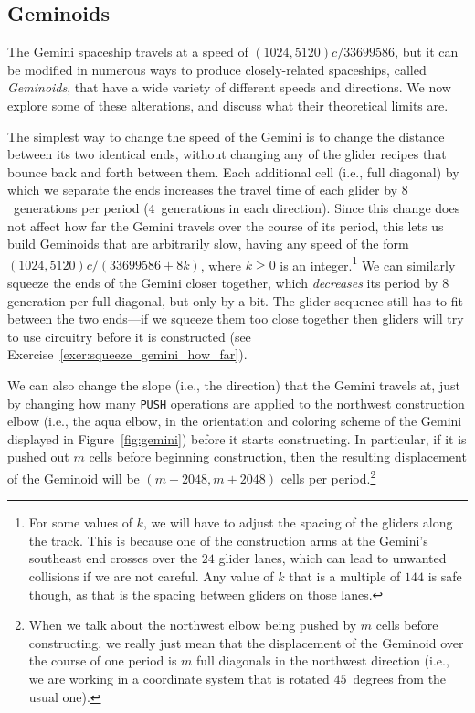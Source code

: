 \subsection{Geminoids}\label{sec:geminoids}

The Gemini spaceship travels at a speed of $(1024,5120)c/33699586$, but it can be modified in numerous ways to produce closely-related spaceships, called \emph{Geminoids}, that have a wide variety of different speeds and directions. We now explore some of these alterations, and discuss what their theoretical limits are.

The simplest way to change the speed of the Gemini is to change the distance between its two identical ends, without changing any of the glider recipes that bounce back and forth between them. Each additional cell (i.e., full diagonal) by which we separate the ends increases the travel time of each glider by $8$~generations per period ($4$~generations in each direction). Since this change does not affect how far the Gemini travels over the course of its period, this lets us build Geminoids that are arbitrarily slow, having any speed of the form $(1024,5120)c/(33699586 + 8k)$, where $k \geq 0$ is an integer.\footnote{For some values of $k$, we will have to adjust the spacing of the gliders along the track. This is because one of the construction arms at the Gemini's southeast end crosses over the $24$ glider lanes, which can lead to unwanted collisions if we are not careful. Any value of $k$ that is a multiple of $144$ is safe though, as that is the spacing between gliders on those lanes.} We can similarly squeeze the ends of the Gemini closer together, which \emph{decreases} its period by $8$ generation per full diagonal, but only by a bit. The glider sequence still has to fit between the two ends---if we squeeze them too close together then gliders will try to use circuitry before it is constructed (see Exercise~\ref{exer:squeeze_gemini_how_far}).

We can also change the slope (i.e., the direction) that the Gemini travels at, just by changing how many \texttt{PUSH} operations are applied to the northwest construction elbow (i.e., the aqua elbow, in the orientation and coloring scheme of the Gemini displayed in Figure~\ref{fig:gemini}) before it starts constructing. In particular, if it is pushed out $m$ cells before beginning construction, then the resulting displacement of the Geminoid will be $(m-2048,m+2048)$ cells per period.\footnote{When we talk about the northwest elbow being pushed by $m$ cells before constructing, we really just mean that the displacement of the Geminoid over the course of one period is $m$ full diagonals in the northwest direction (i.e., we are working in a coordinate system that is rotated $45$~degrees from the usual one).}

